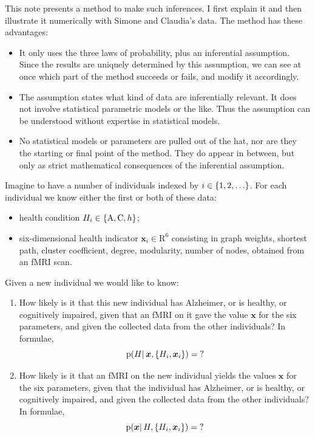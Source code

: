 \documentclass[\ifafour a4paper,12pt,\else a5paper,10pt,\fi%
onecolumn,oneside,article,%
british%
]{memoir}
\theoremstyle{remark}
\theoremstyle{innote}
\newcommand*{\RR}{\bm{\mathrm{R}}}
\DeclarePairedDelimiter\set{\{}{\}}
\newcommand*{\pf}{\mathrm{p}}%
\renewcommand*{\|}{\mathpunct{|}}
\newcommand*{\yH}{H}
\newcommand*{\yh}{h}
\newcommand*{\yx}{x}
\newcommand*{\yxx}{\bm{\yx}}
\newcommand*{\ya}{\mathrm{A}}
\newcommand*{\yi}{\mathrm{C}}
\theoremstyle{plain}
\begin{document}
This note presents a method to make such inferences. I first explain it and
then illustrate it numerically with Simone and Claudia's data. The method
has these advantages:
\begin{itemize}
\item It only uses the three laws of probability, plus an inferential
  assumption. Since the results are uniquely determined by this assumption,
  we can see at once which part of the method succeeds or fails, and
  modify it accordingly.
\item The assumption states what kind of data are inferentially relevant.
  It does not involve statistical parametric models or the like. Thus the
  assumption can be understood without expertise in statistical models.
\item No statistical models or parameters are pulled out of the hat, nor
  are they the starting or final point of the method. They do appear in
  between, but only as strict mathematical consequences of the inferential
  assumption.
\end{itemize}
  

\bigskip

Imagine to have a number of individuals indexed by $i\in\set{1,2,\dotsc}$.
For each individual we know either the first or both of these data:
\begin{itemize}
\item health condition $\yH_i \in \set{\ya, \yi, \yh}$;
\item six-dimensional health indicator $\yxx_i \in \RR^6$ consisting in
  graph weights, shortest path, cluster coefficient, degree, modularity,
  number of nodes, obtained from an fMRI scan.
\end{itemize}

\bigskip

Given a new individual we would like to know:
\begin{enumerate}[wide]
\item How likely is it that this new individual has Alzheimer, or is
  healthy, or cognitively impaired, given that an fMRI on it gave the value
  $\yxx$ for the six parameters, and given the collected data from the
  other individuals? In formulae,
  \begin{equation}
    \label{eq:health_from_fmri}
    \pf(\yH \| \yxx, \set{\yH_i,\yxx_i})=\mathord{?}
  \end{equation}
\item How likely is it that an fMRI on the new individual yields the values
  $\yxx$ for the six parameters, given that the individual has Alzheimer,
  or is healthy, or cognitively impaired, and given the collected data from
  the other individuals? In formulae,
  \begin{equation}
    \label{eq:fmri_from_health}
    \pf(\yxx \| \yH, \set{\yH_i,\yxx_i})=\mathord{?}
  \end{equation}
\end{enumerate}
\end{document}
